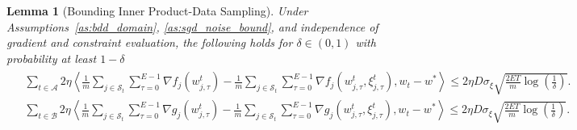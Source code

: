 \documentclass{article} %
\newtheorem{lemma}[]{Lemma}
\def\A{{\mathcal A}}
\def\B{{\mathcal B}}
\def\S{{\mathcal S}}
\newcommand{\inner}[2]{\left\langle #1, #2 \right\rangle}
\begin{document}
\begin{lemma}[Bounding Inner Product-Data Sampling]
    \label{lem:inner_product_bound_data}
    Under Assumptions~\ref{as:bdd_domain}, \ref{as:sgd_noise_bound}, and independence of gradient and constraint evaluation, the following holds for $\delta \in (0,1)$ with probability at least $1-\delta$
    \begin{align*}
        \begin{aligned}
            &\sum_{t \in \A} 2\eta\inner{\frac{1}{m}\sum_{j\in \S_t}\sum_{\tau=0}^{E-1}\nabla f_j(w_{j,\tau}^t) -  \frac{1}{m}\sum_{j\in \S_t}\sum_{\tau=0}^{E-1}\nabla f_j(w_{j,\tau}^t, \xi_{j,\tau}^t)}{w_t-w^*} \leq 2\eta D \sigma_\xi\sqrt{ \frac{2E T}{m}\log(\frac{1}{\delta})}.\\
            &\sum_{t \in \B} 2\eta\inner{\frac{1}{m}\sum_{j\in \S_t}\sum_{\tau=0}^{E-1}\nabla g_j(w_{j,\tau}^t) - \frac{1}{m}\sum_{j\in \S_t}\sum_{\tau=0}^{E-1}\nabla g_j(w_{j,\tau}^t, \xi_{j,\tau}^t)}{w_t-w^*} \leq 2\eta D \sigma_\xi\sqrt{\frac{2E T}{m}\log(\frac{1}{\delta})}.
        \end{aligned}
    \end{align*}
\end{lemma}
\end{document}
